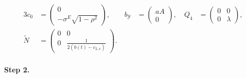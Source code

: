 \documentclass[11pt,twoside]{amsart}
\theoremstyle{definition}
\numberwithin{equation}{section}
\begin{document}
\begin{alignat*}{3}
    c_0 &= \begin{pmatrix} 0 \\ -\sigma^E\sqrt{1-\rho^2} \end{pmatrix}, &\
    b_{\mathcal{Y}} &= \begin{pmatrix} aA \\ 0 \end{pmatrix}, &\
    Q_4 &= \begin{pmatrix} 0 & 0 \\ 0 & \lambda \end{pmatrix}, \\[10pt]
    \widetilde{N} &= \begin{pmatrix}
        0 & 0 \\ 0 & \frac{1}{2(b(t)-c_{2,x})}
    \end{pmatrix}.
\end{alignat*}


\paragraph{\textbf{Step 2.}}
\end{document}
